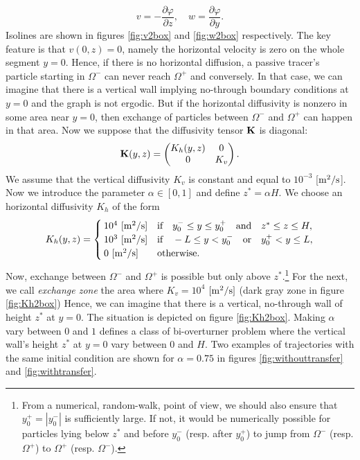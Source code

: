 \begin{equation} \label{eq:u-psi_2box}
	v = -\frac{\partial \varphi}{\partial z}, \quad w = \frac{\partial  \varphi}{\partial y}.
\end{equation}
 Isolines are shown in figures \ref{fig:v2box} and \ref{fig:w2box} respectively. The key feature is that $v(0,z) = 0$, namely the horizontal velocity is zero on the whole segment $y = 0$. Hence, if there is no horizontal diffusion, a passive tracer's particle starting in $\Omega^-$ can never reach $\Omega^+$ and conversely. In that case, we can imagine that there is a vertical wall implying no-through boundary conditions at $y=0$ and the graph is not ergodic. But if the horizontal diffusivity is nonzero in some area near $y=0$, then exchange of particles between $\Omega^-$ and $\Omega^+$ can happen in that area. Now we suppose that the diffusivity tensor $\b K$ is diagonal:
 \begin{equation}
 	\b K(y,z) = \begin{pmatrix} K_h(y,z) & 0\\ 0 & K_v \end{pmatrix}.  	
 \end{equation} 
We assume that the vertical diffusivity $K_v$ is constant and equal to $10^{-3}$ [$\rm{m^2/s}$]. Now we introduce the parameter $\alpha \in [0,1]$ and define $z^* = \alpha H$. We choose an horizontal diffusivity $K_h$ of the form
\begin{equation} \label{eq:Kh2box}
	K_h(y,z) = \begin{cases}
			10^4\ \rm{[m^2/s]} & \mbox{if} \quad y_0^- \le y \le y_0^+ \quad \mbox{and} \quad z^* \le z \le H,\\
			10^3\ \rm{[m^2/s]} & \mbox{if} \quad -L \le y < y_0^- \quad \mbox{or} \quad y_0^+ < y \le L,\\
			0\ \rm{[m^2/s]}  & \mbox{otherwise}.
		\end{cases}
\end{equation}
Now, exchange between $\Omega^-$ and $\Omega^+$ is possible but only above $z^*$.\footnote{From a numerical, random-walk, point of view, we should also ensure that $y_0^+ = |y_0^-|$ is sufficiently large. If not, it would be numerically possible for particles lying below $z^*$ and before $y_0^-$ (resp. after $y_0^+$) to jump from $\Omega^-$ (resp. $\Omega^+$) to $\Omega^+$ (resp. $\Omega^-$).} For the next, we call \textit{exchange zone} the area where $K_v = 10^4$ $\rm{[m^2/s]}$ (dark gray zone in figure \ref{fig:Kh2box}) Hence, we can imagine that there is a vertical, no-through wall of height $z^*$ at $y=0$. The situation is depicted on figure \ref{fig:Kh2box}. Making $\alpha$ vary between $0$ and $1$ defines a class of bi-overturner problem where the vertical wall's height $z^*$ at $y=0$ vary between $0$ and $H$. Two examples of trajectories with the same initial condition are shown for $\alpha = 0.75$ in figures \ref{fig:withouttransfer} and \ref{fig:withtransfer}.

